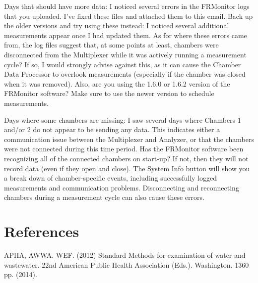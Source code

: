 \documentclass[12pt]{../SOP3}\usepackage[]{graphicx}\usepackage[]{color}
\begin{document}
Days that should have more data: I noticed several errors in the FRMonitor logs that you uploaded. I've fixed these files and attached them to this email. Back up the older versions and try using these instead: I noticed several additional measurements appear once I had updated them. As for where these errors came from, the log files suggest that, at some points at least, chambers were disconnected from the Multiplexer while it was actively running a measurement cycle? If so, I would strongly advise against this, as it can cause the Chamber Data Processor to overlook measurements (especially if the chamber was closed when it was removed). Also, are you using the 1.6.0 or 1.6.2 version of the FRMonitor software? Make sure to use the newer version to schedule measurements.


Days where some chambers are missing: I saw several days where Chambers 1 and/or 2 do not appear to be sending any data. This indicates either a communication issue between the Multiplexer and Analyzer, or that the chambers were not connected during this time period. Has the FRMonitor software been recognizing all of the connected chambers on start-up?  If not, then they will not record data (even if they open and close). The System Info button will show you a break down of chamber-specific events, including successfully logged measurements and communication problems. Disconnecting and reconnecting chambers during a measurement cycle can also cause these errors.




\section{References}



\NP APHA, AWWA. WEF. (2012) Standard Methods for examination of water and wastewater. 22nd American Public Health Association (Eds.). Washington. 1360 pp. (2014).
\end{document}
